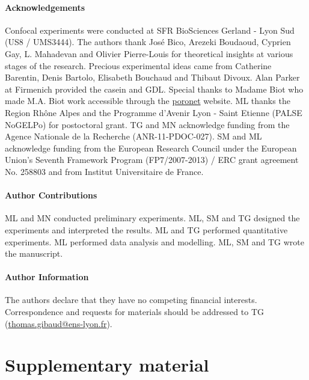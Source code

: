 \documentclass[twocolumn,superscriptaddress,showpacs,preprintnumbers,
amsmath,amssymb,prl]{revtex4-1}
\begin{document}



\paragraph*{Acknowledgements}
Confocal experiments were conducted at SFR BioSciences Gerland - Lyon Sud (US8 / UMS3444).
The authors thank Jos\'e Bico, Arezeki Boudaoud, Cyprien Gay, L. Mahadevan and Olivier Pierre-Louis for theoretical insights at various stages of the research. 
Precious experimental ideas came from Catherine Barentin, Denis Bartolo, Elisabeth Bouchaud and Thibaut Divoux.
Alan Parker at Firmenich provided the casein and GDL. 
Special thanks to Madame Biot who made M.A. Biot work accessible through the \href{http://www.olemiss.edu/sciencenet/poronet/}{poronet} website. 
ML thanks the Region Rhône Alpes and the Programme d'Avenir Lyon - Saint Etienne (PALSE NoGELPo) for postoctoral grant. 
TG and MN acknowledge funding from the Agence Nationale de la Recherche (ANR-11-PDOC-027). 
SM and ML acknowledge funding from the European Research Council under the European Union's Seventh Framework Program (FP7/2007-2013) / ERC grant agreement No. 258803 and from Institut Universitaire de France.


\paragraph*{Author Contributions}
ML and MN conducted preliminary experiments. ML, SM and TG designed the experiments and interpreted the results. ML and TG performed quantitative experiments. ML performed data analysis and modelling. ML, SM and TG wrote the manuscript.


\paragraph*{Author Information} 
The authors declare that they have no competing financial interests. 
Correspondence and requests for materials should be addressed to TG (\href{mailto:thomas.gibaud@ens-lyon.fr}{thomas.gibaud@ens-lyon.fr}).






\clearpage
\newpage
\setcounter{figure}{0}

\section*{Supplementary material}
\end{document}
